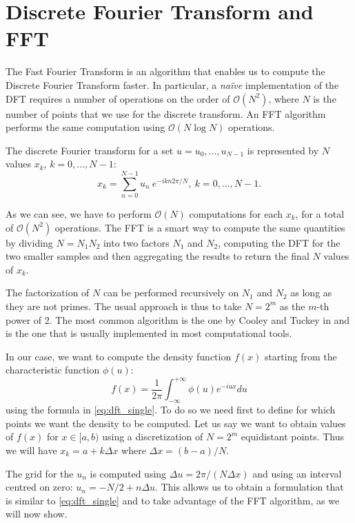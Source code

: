 \chapter{Discrete Fourier Transform and FFT}
\label{app:FFT}

The Fast Fourier Transform is an algorithm that enables us to compute the Discrete Fourier Transform faster. In particular, a \textit{na\"ive} implementation of the DFT requires a number of operations on the order of $\mathcal{O}(N^2)$, where $N$ is the number of points that we use for the discrete transform. An FFT algorithm performs the same computation using $\mathcal{O}(N \log N)$ operations.


 The discrete Fourier transform for a set $u = u_0 , ..., u_{N-1}$ is  represented by $N$ values $x_k$, $k=0, ..., N-1$:
\begin{equation}
\label{eq:dft_single}
	x_k = \sum_{n=0}^{N-1} u_n \:e^{-i  k n 2\pi / N}, \: k= 0, \dots, N-1.
\end{equation}


As we can see, we have to perform $\mathcal{O}(N)$ computations for each $x_k$, for a total of $\mathcal{O}(N^2)$ operations.
The FFT is a smart way to compute the same quantities by dividing $ N = N_1N_2$ into two factors $ N_1$ and $N_2$, computing the DFT for the two smaller samples and then aggregating the results to return the final $N$ values of $x_k$.

The factorization of $N$ can be performed recursively on $N_1$ and $N_2$ as long as they are not primes. The usual approach is thus to take $N=2^m$ as the $m$-th power of 2. 
The most common algorithm is the one by Cooley and Tuckey in \cite{COOLEY_FFT} and is the one that is usually implemented in most computational tools.


In our case, we want to compute the density function $f(x)$ starting from the characteristic function $\phi(u)$:
\begin{equation}
\label{eq:general_pdf_chf}
f(x) = \frac{1}{2\pi}\int_{-\infty}^{+\infty} \phi(u) e^{-i u x} du
\end{equation}
 using the formula in \eqref{eq:dft_single}. To do so we need first to define for which points we want the density to be computed.
 Let us say we want to obtain values of $f(x)$ for $x\in [a, b)$ using a discretization of $N=2^m$ equidistant points.
 Thus we will have $x_k = a + k \Delta x$ where $\Delta x = (b-a)/N$. 
 
The grid for the $u_n$ is computed using $\Delta u = 2 \pi /(N \Delta x)$ and using an interval centred on zero: $u_n = - N/2 + n \Delta u$. This allows us to obtain a formulation that is similar to \eqref{eq:dft_single} and to take advantage of the FFT algorithm, as we will now show.
 
